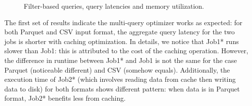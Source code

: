 \begin{figure}[!htb]
	\centering


   \caption{Filter-based queries, query latencies and memory utilization.}
   \label{fig:query1}
\end{figure}

The first set of results indicate the multi-query optimizer works as expected: for both Parquet and CSV input format, the aggregate query latency for the two jobs is shorter with caching optimization. In details, we notice that Job1* runs slower than Job1: this is attributed to the cost of the caching operation. However, the difference in runtime between Job1* and Job1 is not the same for the case Parquet (noticeable different) and CSV (somehow equals). Additionally, the execution time of Job2* (which involves reading data from cache then writing data to disk) for both formats shows different pattern: when data is in Parquet format, Job2* benefits less from caching.

